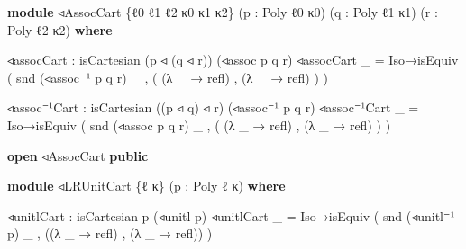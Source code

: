 \documentclass[
  11pt,
  oneside,
  article]{memoir}
\newenvironment{Shaded}{}{}
\newcommand{\KeywordTok}[1]{\textcolor[rgb]{0.00,0.44,0.13}{\textbf{#1}}}
\newcommand{\NormalTok}[1]{#1}
\newcommand{\OtherTok}[1]{\textcolor[rgb]{0.00,0.44,0.13}{#1}}
\theoremstyle{definition}
\theoremstyle{plain}
\newcommand{\0}{\textsf{0}}
\newcommand{\1}{\tn{\textsf{1}}}
\begin{document}
\begin{Shaded}
\begin{Highlighting}[]
\KeywordTok{module}\NormalTok{ ◃AssocCart }\OtherTok{\{}\NormalTok{ℓ0 ℓ1 ℓ2 κ0 κ1 κ2}\OtherTok{\}} \OtherTok{(}\NormalTok{p }\OtherTok{:}\NormalTok{ Poly ℓ0 κ0}\OtherTok{)} 
                  \OtherTok{(}\NormalTok{q }\OtherTok{:}\NormalTok{ Poly ℓ1 κ1}\OtherTok{)} \OtherTok{(}\NormalTok{r }\OtherTok{:}\NormalTok{ Poly ℓ2 κ2}\OtherTok{)} \KeywordTok{where}

\NormalTok{    ◃assocCart }\OtherTok{:}\NormalTok{ isCartesian }\OtherTok{(}\NormalTok{p ◃ }\OtherTok{(}\NormalTok{q ◃ r}\OtherTok{))} \OtherTok{(}\NormalTok{◃assoc p q r}\OtherTok{)}
\NormalTok{    ◃assocCart }\OtherTok{\_} \OtherTok{=} 
\NormalTok{        Iso→isEquiv }
            \OtherTok{(}\NormalTok{ snd }\OtherTok{(}\NormalTok{◃assoc⁻¹ p q r}\OtherTok{)} \OtherTok{\_} 
\NormalTok{            , }\OtherTok{(} \OtherTok{(λ} \OtherTok{\_} \OtherTok{→}\NormalTok{ refl}\OtherTok{)}\NormalTok{ , }\OtherTok{(λ} \OtherTok{\_} \OtherTok{→}\NormalTok{ refl}\OtherTok{)} \OtherTok{)} \OtherTok{)}
    
\NormalTok{    ◃assoc⁻¹Cart }\OtherTok{:}\NormalTok{ isCartesian }\OtherTok{((}\NormalTok{p ◃ q}\OtherTok{)}\NormalTok{ ◃ r}\OtherTok{)} \OtherTok{(}\NormalTok{◃assoc⁻¹ p q r}\OtherTok{)}
\NormalTok{    ◃assoc⁻¹Cart }\OtherTok{\_} \OtherTok{=} 
\NormalTok{        Iso→isEquiv }
            \OtherTok{(}\NormalTok{ snd }\OtherTok{(}\NormalTok{◃assoc p q r}\OtherTok{)} \OtherTok{\_} 
\NormalTok{            , }\OtherTok{(} \OtherTok{(λ} \OtherTok{\_} \OtherTok{→}\NormalTok{ refl}\OtherTok{)}\NormalTok{ , }\OtherTok{(λ} \OtherTok{\_} \OtherTok{→}\NormalTok{ refl}\OtherTok{)} \OtherTok{)} \OtherTok{)}

\KeywordTok{open}\NormalTok{ ◃AssocCart }\KeywordTok{public}

\KeywordTok{module}\NormalTok{ ◃LRUnitCart }\OtherTok{\{}\NormalTok{ℓ κ}\OtherTok{\}} \OtherTok{(}\NormalTok{p }\OtherTok{:}\NormalTok{ Poly ℓ κ}\OtherTok{)} \KeywordTok{where}

\NormalTok{    ◃unitlCart }\OtherTok{:}\NormalTok{ isCartesian p }\OtherTok{(}\NormalTok{◃unitl p}\OtherTok{)}
\NormalTok{    ◃unitlCart }\OtherTok{\_} \OtherTok{=} 
\NormalTok{        Iso→isEquiv }
            \OtherTok{(}\NormalTok{ snd }\OtherTok{(}\NormalTok{◃unitl⁻¹ p}\OtherTok{)} \OtherTok{\_} 
\NormalTok{            , }\OtherTok{((λ} \OtherTok{\_} \OtherTok{→}\NormalTok{ refl}\OtherTok{)}\NormalTok{ , }\OtherTok{(λ} \OtherTok{\_} \OtherTok{→}\NormalTok{ refl}\OtherTok{))} \OtherTok{)}


\end{Highlighting}
\end{Shaded}
\end{document}
